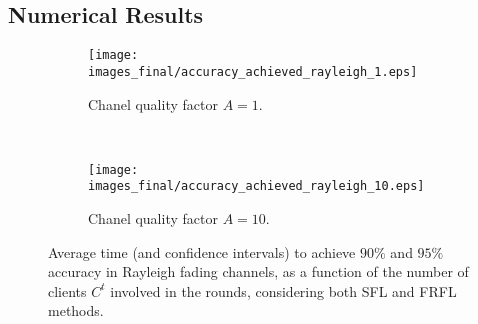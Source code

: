 \documentclass[10pt, conference, letterpaper]{IEEEtran}
\begin{document}
	\subsection{Numerical Results}
	\label{sub:numerical_results}
	
	
	\begin{figure}[t!]
		\centering
		\begin{subfigure}{0.45\textwidth}
			\centering
			\texttt{[image: images\_final/accuracy\_achieved\_rayleigh\_1.eps]}
			\caption{Chanel quality factor $A=1$.}
			\label{fig:rayleigh_accuracy_1}
		\end{subfigure}\\[5pt]
		\begin{subfigure}{0.45\textwidth}
			\centering
			\texttt{[image: images\_final/accuracy\_achieved\_rayleigh\_10.eps]}  
			\caption{Chanel quality factor $A=10$.}
			\label{fig:rayleigh_accuracy_10}
		\end{subfigure}
		\caption{Average time (and confidence intervals) to achieve $90\%$ and $95\%$ accuracy in Rayleigh fading channels, as a function of the number of clients $C^t$ involved in the rounds, considering both SFL and FRFL methods.\vspace{-0.33cm}}
		\label{fig:rayleigh_accuracy}
	\end{figure}
	
\end{document}
